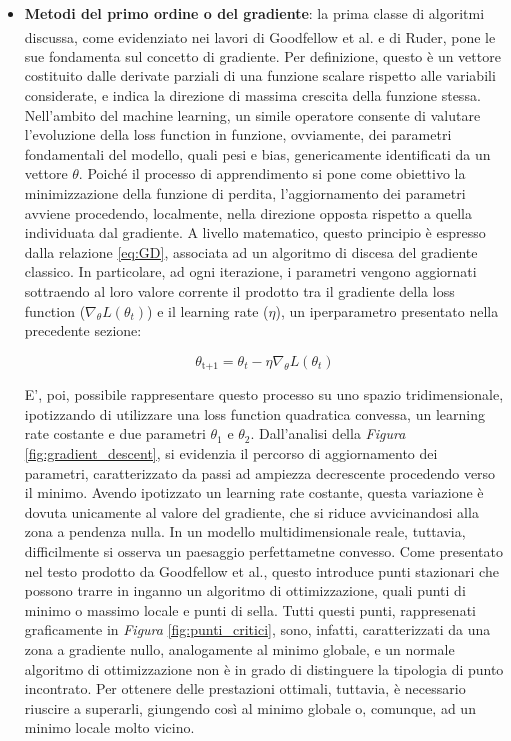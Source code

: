     \begin{itemize}

        \item \textbf{Metodi del primo ordine o del gradiente}: la prima classe di algoritmi discussa, come evidenziato nei lavori di Goodfellow et al.\textsuperscript{\parencite[Sez.~8]{Goodfellow}} e di Ruder\cite{Ruder_GD}, pone le sue fondamenta sul concetto di gradiente. Per definizione, questo è un vettore costituito dalle derivate parziali di una funzione scalare rispetto alle variabili considerate, e indica la direzione di massima crescita della funzione stessa. Nell'ambito del machine learning, un simile operatore consente di valutare l'evoluzione della loss function in funzione, ovviamente, dei parametri fondamentali del modello, quali pesi e bias, genericamente identificati da un vettore $\theta$. Poiché il processo di apprendimento si pone come obiettivo la minimizzazione della funzione di perdita, l'aggiornamento dei parametri avviene procedendo, localmente, nella direzione opposta rispetto a quella individuata dal gradiente. A livello matematico, questo principio è espresso dalla relazione \ref{eq:GD}, associata ad un algoritmo di discesa del gradiente classico. In particolare, ad ogni iterazione, i parametri vengono aggiornati sottraendo al loro valore corrente il prodotto tra il gradiente della loss function ($\nabla_{\theta} L(\theta_{t})$) e il learning rate ($\eta$), un iperparametro presentato nella precedente sezione:
        
            \begin{equation}
                \theta_{\text{t+1}} = \theta_{t} - \eta \nabla_{\theta} L(\theta_{t})
                \label{eq:GD}
            \end{equation}

        E', poi, possibile rappresentare questo processo su uno spazio tridimensionale, ipotizzando di utilizzare una loss function quadratica convessa, un learning rate costante e due parametri $\theta_{1}$ e $\theta_{2}$. Dall'analisi della \emph{Figura} \ref{fig:gradient_descent}, si evidenzia il percorso di aggiornamento dei parametri, caratterizzato da passi ad ampiezza decrescente procedendo verso il minimo. Avendo ipotizzato un learning rate costante, questa variazione è dovuta unicamente al valore del gradiente, che si riduce avvicinandosi alla zona a pendenza nulla. In un modello multidimensionale reale, tuttavia, difficilmente si osserva un paesaggio perfettametne convesso. Come presentato nel testo prodotto da Goodfellow et al., questo introduce punti stazionari che possono trarre in inganno un algoritmo di ottimizzazione, quali punti di minimo o massimo locale e punti di sella. Tutti questi punti, rappresenati graficamente in \emph{Figura} \ref{fig:punti_critici}, sono, infatti, caratterizzati da una zona a gradiente nullo, analogamente al minimo globale, e un normale algoritmo di ottimizzazione non è in grado di distinguere la tipologia di punto incontrato. Per ottenere delle prestazioni ottimali, tuttavia, è necessario riuscire a superarli, giungendo così al minimo globale o, comunque, ad un minimo locale molto vicino.
    

\end{itemize}
